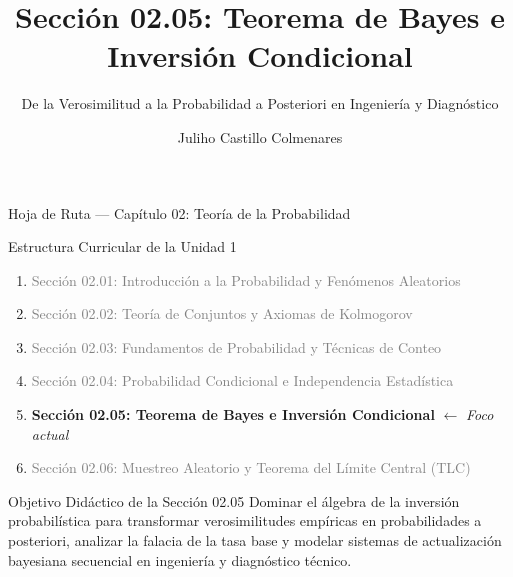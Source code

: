 \documentclass[10pt, aspectratio=169]{beamer}
\title[Teorema de Bayes]{Sección 02.05: Teorema de Bayes e Inversión Condicional}
\subtitle{De la Verosimilitud a la Probabilidad a Posteriori en Ingeniería y Diagnóstico}
\author[J. Castillo Colmenares]{Juliho Castillo Colmenares}
\institute{Tecnológico de Monterrey}
\date{\vspace{-2.0cm}}
\begin{document}
\begin{frame}[plain]
  \vspace{-0.5cm}
  \titlepage
\end{frame}

\begin{frame}{Hoja de Ruta --- Capítulo 02: Teoría de la Probabilidad}
  \begin{block}{Estructura Curricular de la Unidad 1}
    \footnotesize
    \begin{enumerate}\itemsep=0.08cm
      \item \textcolor{gray}{Sección 02.01: Introducción a la Probabilidad y Fenómenos Aleatorios}
      \item \textcolor{gray}{Sección 02.02: Teoría de Conjuntos y Axiomas de Kolmogorov}
      \item \textcolor{gray}{Sección 02.03: Fundamentos de Probabilidad y Técnicas de Conteo}
      \item \textcolor{gray}{Sección 02.04: Probabilidad Condicional e Independencia Estadística}
      \item \textbf{\textcolor{TecRojo}{Sección 02.05: Teorema de Bayes e Inversión Condicional}} $\leftarrow$ \emph{Foco actual}
      \item \textcolor{gray}{Sección 02.06: Muestreo Aleatorio y Teorema del Límite Central (TLC)}
    \end{enumerate}
  \end{block}
  \vspace{-0.05cm}
  \pause
  \begin{alertblock}{Objetivo Didáctico de la Sección 02.05}
    \footnotesize
    Dominar el álgebra de la inversión probabilística para transformar verosimilitudes empíricas en probabilidades a posteriori, analizar la falacia de la tasa base y modelar sistemas de actualización bayesiana secuencial en ingeniería y diagnóstico técnico.
  \end{alertblock}
\end{frame}
\end{document}
